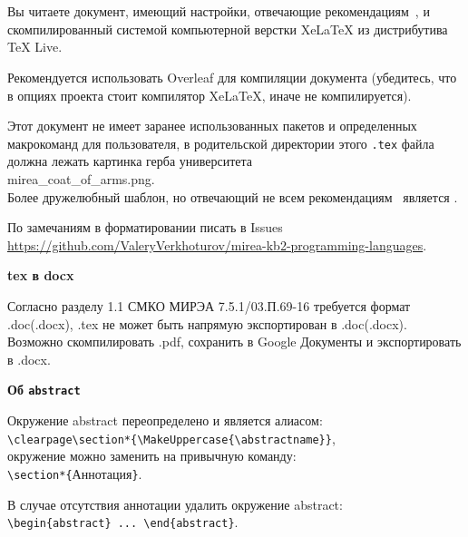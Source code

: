 \documentclass[14pt, a4paper, titlepage]{extarticle}
\renewenvironment{abstract}{\clearpage\section*{\MakeUppercase{\abstractname}}}{}
\begin{document}
\begin{abstract}
    Вы читаете документ, имеющий настройки, отвечающие рекомендациям~\cite{bib:recomendations}, и скомпилированный системой компьютерной верстки Xe\LaTeX{} из дистрибутива TeX Live.
    
    Рекомендуется использовать Overleaf для компиляции документа (убедитесь, что в опциях проекта стоит компилятор XeLaTeX, иначе не компилируется).
    
    Этот документ не имеет заранее использованных пакетов и определенных макрокоманд для пользователя, в родительской директории этого \verb".tex" файла должна лежать картинка герба университета {\\\centering mirea\_coat\_of\_arms.png.\\} Более дружелюбный шаблон, но отвечающий не всем рекомендациям~\cite{bib:recomendations} является \cite{bib:mntemplate}.
    
    По замечаниям в форматировании писать в Issues \url{https://github.com/ValeryVerkhoturov/mirea-kb2-programming-languages}.
    
    \textbf{tex в docx}
    
    Согласно разделу 1.1 СМКО МИРЭА 7.5.1/03.П.69-16 требуется формат .doc(.docx), .tex не может быть напрямую экспортирован в .doc(.docx). Возможно скомпилировать .pdf, сохранить в Google Документы и экспортировать в .docx.

    \textbf{Об \texttt{abstract}}
    
    Окружение abstract переопределено и является алиасом: \\ \verb"\clearpage\section*{\MakeUppercase{\abstractname}}", \\ окружение можно заменить на привычную команду: \\ \verb"\section*{"Аннотация\verb"}".
    
    В случае отсутствия аннотации удалить окружение abstract: \\\verb"\begin{abstract} ... \end{abstract}".
\end{abstract}

\clearpage
\tableofcontents
\end{document}
